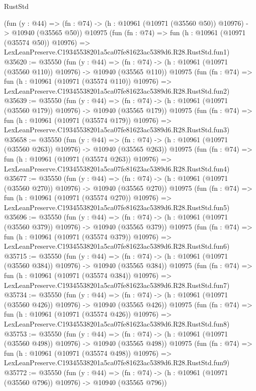 \begin{lexlean}{RustStd}
\begin{coremodule}
    (fun (y : @44) =>
    (fn : @74) -> (h : @10961 (@10971 (@35560 @50)) @10976) -> @10940 (@35565 @50))
    @10975
    (fun (fn : @74) =>
    fun (h : @10961 (@10971 (@35574 @50)) @10976) =>
    LexLeanPreserve.C19345538201a5ca07fe81623ac5389d6.R28.RustStd.fun1)
@35620 := @35550
    (fun (y : @44) =>
    (fn : @74) -> (h : @10961 (@10971 (@35560 @110)) @10976) -> @10940 (@35565 @110))
    @10975
    (fun (fn : @74) =>
    fun (h : @10961 (@10971 (@35574 @110)) @10976) =>
    LexLeanPreserve.C19345538201a5ca07fe81623ac5389d6.R28.RustStd.fun2)
@35639 := @35550
    (fun (y : @44) =>
    (fn : @74) -> (h : @10961 (@10971 (@35560 @179)) @10976) -> @10940 (@35565 @179))
    @10975
    (fun (fn : @74) =>
    fun (h : @10961 (@10971 (@35574 @179)) @10976) =>
    LexLeanPreserve.C19345538201a5ca07fe81623ac5389d6.R28.RustStd.fun3)
@35658 := @35550
    (fun (y : @44) =>
    (fn : @74) -> (h : @10961 (@10971 (@35560 @263)) @10976) -> @10940 (@35565 @263))
    @10975
    (fun (fn : @74) =>
    fun (h : @10961 (@10971 (@35574 @263)) @10976) =>
    LexLeanPreserve.C19345538201a5ca07fe81623ac5389d6.R28.RustStd.fun4)
@35677 := @35550
    (fun (y : @44) =>
    (fn : @74) -> (h : @10961 (@10971 (@35560 @270)) @10976) -> @10940 (@35565 @270))
    @10975
    (fun (fn : @74) =>
    fun (h : @10961 (@10971 (@35574 @270)) @10976) =>
    LexLeanPreserve.C19345538201a5ca07fe81623ac5389d6.R28.RustStd.fun5)
@35696 := @35550
    (fun (y : @44) =>
    (fn : @74) -> (h : @10961 (@10971 (@35560 @379)) @10976) -> @10940 (@35565 @379))
    @10975
    (fun (fn : @74) =>
    fun (h : @10961 (@10971 (@35574 @379)) @10976) =>
    LexLeanPreserve.C19345538201a5ca07fe81623ac5389d6.R28.RustStd.fun6)
@35715 := @35550
    (fun (y : @44) =>
    (fn : @74) -> (h : @10961 (@10971 (@35560 @384)) @10976) -> @10940 (@35565 @384))
    @10975
    (fun (fn : @74) =>
    fun (h : @10961 (@10971 (@35574 @384)) @10976) =>
    LexLeanPreserve.C19345538201a5ca07fe81623ac5389d6.R28.RustStd.fun7)
@35734 := @35550
    (fun (y : @44) =>
    (fn : @74) -> (h : @10961 (@10971 (@35560 @426)) @10976) -> @10940 (@35565 @426))
    @10975
    (fun (fn : @74) =>
    fun (h : @10961 (@10971 (@35574 @426)) @10976) =>
    LexLeanPreserve.C19345538201a5ca07fe81623ac5389d6.R28.RustStd.fun8)
@35753 := @35550
    (fun (y : @44) =>
    (fn : @74) -> (h : @10961 (@10971 (@35560 @498)) @10976) -> @10940 (@35565 @498))
    @10975
    (fun (fn : @74) =>
    fun (h : @10961 (@10971 (@35574 @498)) @10976) =>
    LexLeanPreserve.C19345538201a5ca07fe81623ac5389d6.R28.RustStd.fun9)
@35772 := @35550
    (fun (y : @44) =>
    (fn : @74) -> (h : @10961 (@10971 (@35560 @796)) @10976) -> @10940 (@35565 @796))

\end{coremodule}
\end{lexlean}
